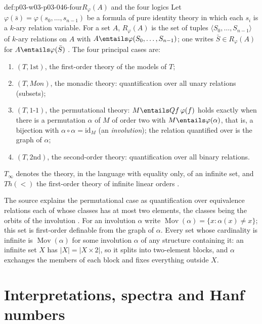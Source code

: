 \begin{hbdefinition}{def:p03-w03-p03-046-four}{\(R_\varphi(A)\) and the four logics}
Let \(\varphi(\bar s)=\varphi(s_0,\dots,s_{n-1})\) be a formula of pure
identity theory in which each \(s_i\) is a \(k\)-ary relation variable. For
a set \(A\), \(R_\varphi(A)\) is the set of tuples
\(\langle S_0,\dots,S_{n-1}\rangle\) of \(k\)-ary relations on \(A\) with
\(A\entails\varphi(S_0,\dots,S_{n-1})\); one writes \(\bar S\in
R_\varphi(A)\) for \(A\entails\varphi(\bar S)\)
\cite[p.~240, Notation~2.1.2]{BaldwinShelah1985}. The four principal
cases are:
\begin{enumerate}
  \item \((T,\mathrm{1st})\), the first-order theory of the models of \(T\);
  \item \((T,\mathit{Mon})\), the monadic theory: quantification over all
        unary relations (subsets);
  \item \((T,\text{1-1})\), the permutational theory:
        \(M\entails Q f\,\varphi(f)\) holds exactly when there is a
        permutation \(\alpha\) of \(M\) of order two with
        \(M\entails\varphi(\alpha)\), that is, a bijection with
        \(\alpha\circ\alpha=\mathrm{id}_M\) (an \emph{involution});
        the relation quantified over is the graph of \(\alpha\);
  \item \((T,\mathrm{2nd})\), the second-order theory: quantification over
        all binary relations.
\end{enumerate}
\(T_\infty\) denotes the theory, in the language with equality only, of an
infinite set, and \(\mathit{Th}(<)\) the first-order theory of infinite
linear orders \cite[pp.~231, 240]{BaldwinShelah1985}.
\end{hbdefinition}

The source explains the permutational case as quantification over
equivalence relations each of whose classes has at most two elements, the
classes being the orbits of the involution \cite[p.~240]{BaldwinShelah1985}.
For an involution \(\alpha\) write
\(\operatorname{Mov}(\alpha)=\{x:\alpha(x)\neq x\}\); this set is
first-order definable from the graph of \(\alpha\). Every set whose
cardinality is infinite is \(\operatorname{Mov}(\alpha)\) for some
involution \(\alpha\) of any structure containing it: an infinite set
\(X\) has \(|X|=|X\times 2|\), so it splits into two-element blocks, and
\(\alpha\) exchanges the members of each block and fixes everything outside
\(X\).

\section{Interpretations, spectra and Hanf numbers}
\label{sec:p03-w03-p03-046-interpretations}

